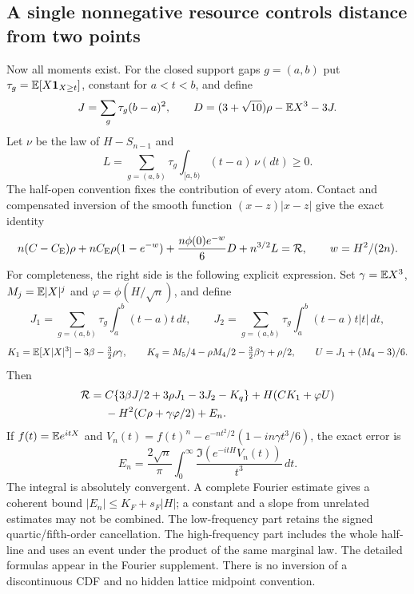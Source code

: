 \subsection{A single nonnegative resource controls distance from two points}

Now all moments exist. For the closed support gaps $g=(a,b)$ put
$\tau_g=\mathbb E[X\mathbf1_{X\ge t}]$, constant for $a<t<b$, and define
\[
 J=\sum_g\tau_g(b-a)^2,\qquad
 D=(3+\sqrt{10})\rho-\mathbb E X^3-3J.
\]
Let $\nu$ be the law of $H-S_{n-1}$ and
\[
 L=\sum_{g=(a,b)}\tau_g\int_{[a,b)}(t-a)\,\nu(dt)\ge0.
\]
The half-open convention fixes the contribution of every atom. Contact
and compensated inversion of the smooth function $(x-z)|x-z|$ give
the exact identity
\begin{equation}\label{ext:resource-identity}
 n(C-C_{\mathrm E})\rho+nC_{\mathrm E}\rho(1-e^{-w})
       +\frac{n\phi(0)e^{-w}}6D+n^{3/2}L=\mathcal R,
 \qquad w=H^2/(2n).
\end{equation}
For completeness, the right side is the following explicit expression.
Set $\gamma=\mathbb E X^3$, $M_j=\mathbb E|X|^j$ and
$\varphi=\phi(H/\sqrt n)$, and define
\[
 J_1=\sum_{g=(a,b)}\tau_g\int_a^b(t-a)t\,dt,\qquad
 J_2=\sum_{g=(a,b)}\tau_g\int_a^b(t-a)t|t|\,dt,
\]
\[
 K_1=\mathbb E[X|X|^3]-3\beta-\tfrac32\rho\gamma,\qquad
 K_q=M_5/4-\rho M_4/2-\tfrac32\beta\gamma+\rho/2,
 \qquad U=J_1+(M_4-3)/6.
\]
Then
\begin{align}\label{ext:resource-remainder}
 \mathcal R={}&C\{3\beta J/2+3\rho J_1-3J_2-K_q\}
      +H(CK_1+\varphi U)\notag\\
 &-H^2(C\rho+\gamma\varphi/2)+E_n.
\end{align}
If $f(t)=\mathbb E e^{itX}$ and
$V_n(t)=f(t)^n-e^{-nt^2/2}(1-in\gamma t^3/6)$, the exact error is
\[
 E_n=\frac{2\sqrt n}{\pi}\int_0^\infty
             \frac{\Im(e^{-itH}V_n(t))}{t^3}\,dt.
\]
The integral is absolutely convergent. A complete Fourier estimate
gives a coherent bound $|E_n|\le K_F+s_F|H|$; a constant and a slope
from unrelated estimates may not be combined. The low-frequency part retains the signed
quartic/fifth-order cancellation. The high-frequency part includes the
whole half-line and uses an event under the product of the same
marginal law. The detailed formulas appear in the Fourier supplement.
There is no inversion of a discontinuous CDF and no hidden lattice
midpoint convention.

